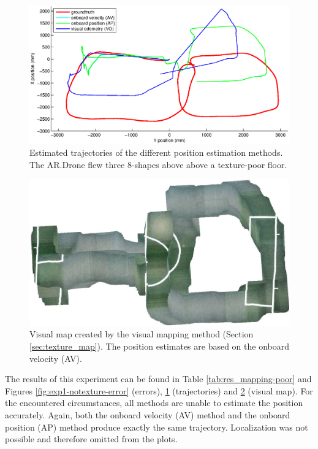 \begin{figure}[htb!]
\centering
\includegraphics[width=\linewidth]{images/exp1-run2-path.eps}
\caption{Estimated trajectories of the different position estimation methods. The AR.Drone flew three 8-shapes above above a texture-poor floor.}
\label{fig:exp1-notexture-path}
\end{figure}

\begin{figure}[htb!]
\centering
\includegraphics[width=0.75\linewidth]{images/exp1-run2-map.jpg}
\caption{Visual map created by the visual mapping method (Section \ref{sec:texture_map}). The position estimates are based on the onboard velocity (AV).}
\label{fig:exp1-notexture-map}
\end{figure}


The results of this experiment can be found in Table \ref{tab:res_mapping-poor} and Figures \ref{fig:exp1-notexture-error} (errors), \ref{fig:exp1-notexture-path} (trajectories) and \ref{fig:exp1-notexture-map} (visual map).
For the encountered circumstances, all methods are unable to estimate the position accurately.
Again, both the onboard velocity (AV) method and the onboard position (AP) method produce exactly the same trajectory.
Localization was not possible and therefore omitted from the plots.

